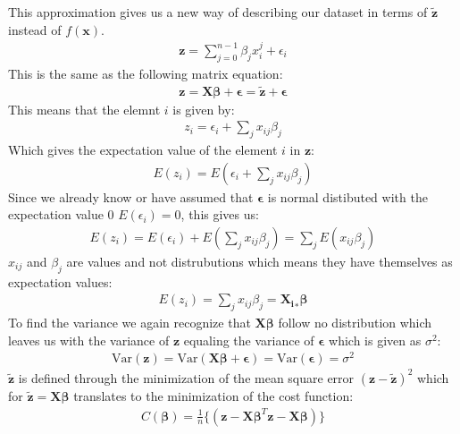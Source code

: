 \documentclass[12pt]{article}
\begin{document}
This approximation gives us a new way of describing our dataset in terms of $\boldsymbol{\tilde{z}}$ instead of $f(\boldsymbol{x})$.
\begin{align*}
  \boldsymbol{z} = \sum_{j=0}^{n-1}\beta_jx_i^j + \epsilon_i
\end{align*}
This is the same as the following matrix equation:
\begin{align*}
  \boldsymbol{z} = \boldsymbol{X}\boldsymbol{\beta} + \boldsymbol{\epsilon} = \boldsymbol{\tilde{z}} + \boldsymbol{\epsilon}
\end{align*}
This means that the elemnt $i$ is given by:
\begin{align*}
  z_i = \epsilon_i + \sum_j x_{ij}\beta_j
\end{align*}
Which gives the expectation value of the element $i$ in $\boldsymbol{z}$:
\begin{align*}
  E(z_i) = E(\epsilon_i + \sum_j x_{ij}\beta_j)
\end{align*}
Since we already know or have assumed that $\boldsymbol{\epsilon}$ is normal distibuted with the expectation value 0 $E(\epsilon_i)=0$, this gives us:
\begin{align*}
  E(z_i) = E(\epsilon_i) + E(\sum_j x_{ij}\beta_j) = \sum_jE(x_{ij}\beta_j)
\end{align*}
$x_{ij}$ and $\beta_j$ are values and not distrubutions which means they have themselves as expectation values:
\begin{align*}
    E(z_i) = \sum_jx_{ij}\beta_j = \boldsymbol{X_i}_*\boldsymbol{\beta}
\end{align*}
To find the variance we again recognize that $\boldsymbol{X}\boldsymbol{\beta}$ follow no distribution which leaves us with the variance of $\boldsymbol{z}$ equaling the variance of $\boldsymbol{\epsilon}$ which is given as $\sigma^2$:
\begin{align*}
  \text{Var}(\boldsymbol{z}) = \text{Var}(\boldsymbol{X}\boldsymbol{\beta} + \boldsymbol{\epsilon}) = \text{Var}(\boldsymbol{\epsilon}) = \sigma^2
\end{align*}
$\boldsymbol{\tilde{z}}$ is defined through the minimization of the mean square error $(\boldsymbol{z} - \boldsymbol{\tilde{z}})^2$ which for $\boldsymbol{\tilde{z}} = \boldsymbol{X}\boldsymbol{\beta}$ translates to the minimization of the cost function:
\begin{align*}
  C(\boldsymbol{\beta}) = \frac{1}{ n}\{(\boldsymbol{z}- \boldsymbol{X}\boldsymbol{\beta}^T\boldsymbol{z}- \boldsymbol{X}\boldsymbol{\beta})\}
\end{align*}
\end{document}
